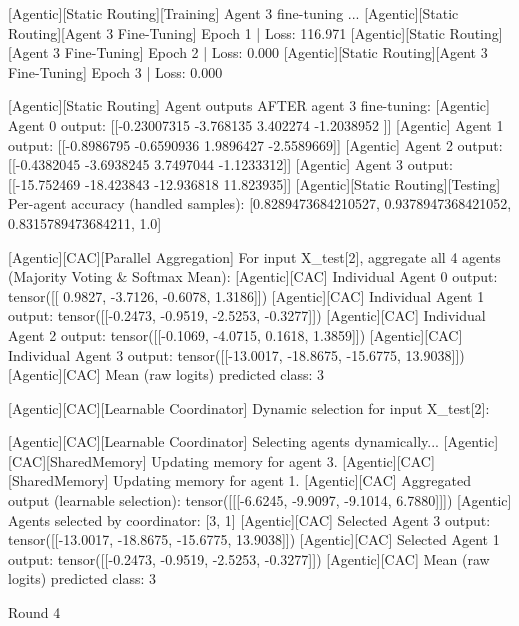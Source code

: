 [Agentic][Static Routing][Training] Agent 3 fine-tuning ...
[Agentic][Static Routing][Agent 3 Fine-Tuning] Epoch 1 | Loss: 116.971
[Agentic][Static Routing][Agent 3 Fine-Tuning] Epoch 2 | Loss: 0.000
[Agentic][Static Routing][Agent 3 Fine-Tuning] Epoch 3 | Loss: 0.000

[Agentic][Static Routing] Agent outputs AFTER agent 3 fine-tuning:
[Agentic] Agent 0 output: [[-0.23007315 -3.768135    3.402274   -1.2038952 ]]
[Agentic] Agent 1 output: [[-0.8986795 -0.6590936  1.9896427 -2.5589669]]
[Agentic] Agent 2 output: [[-0.4382045 -3.6938245  3.7497044 -1.1233312]]
[Agentic] Agent 3 output: [[-15.752469 -18.423843 -12.936818  11.823935]]
[Agentic][Static Routing][Testing] Per-agent accuracy (handled samples): [0.8289473684210527, 0.9378947368421052, 0.8315789473684211, 1.0]

[Agentic][CAC][Parallel Aggregation] For input X_test[2], aggregate all 4 agents (Majority Voting & Softmax Mean):
[Agentic][CAC] Individual Agent 0 output: tensor([[ 0.9827, -3.7126, -0.6078,  1.3186]])
[Agentic][CAC] Individual Agent 1 output: tensor([[-0.2473, -0.9519, -2.5253, -0.3277]])
[Agentic][CAC] Individual Agent 2 output: tensor([[-0.1069, -4.0715,  0.1618,  1.3859]])
[Agentic][CAC] Individual Agent 3 output: tensor([[-13.0017, -18.8675, -15.6775,  13.9038]])
[Agentic][CAC] Mean (raw logits) predicted class: 3

[Agentic][CAC][Learnable Coordinator] Dynamic selection for input X_test[2]:

[Agentic][CAC][Learnable Coordinator] Selecting agents dynamically...
[Agentic][CAC][SharedMemory] Updating memory for agent 3.
[Agentic][CAC][SharedMemory] Updating memory for agent 1.
[Agentic][CAC] Aggregated output (learnable selection): tensor([[[-6.6245, -9.9097, -9.1014,  6.7880]]])
[Agentic] Agents selected by coordinator: [3, 1]
[Agentic][CAC] Selected Agent 3 output: tensor([[-13.0017, -18.8675, -15.6775,  13.9038]])
[Agentic][CAC] Selected Agent 1 output: tensor([[-0.2473, -0.9519, -2.5253, -0.3277]])
[Agentic][CAC] Mean (raw logits) predicted class: 3

Round 4

